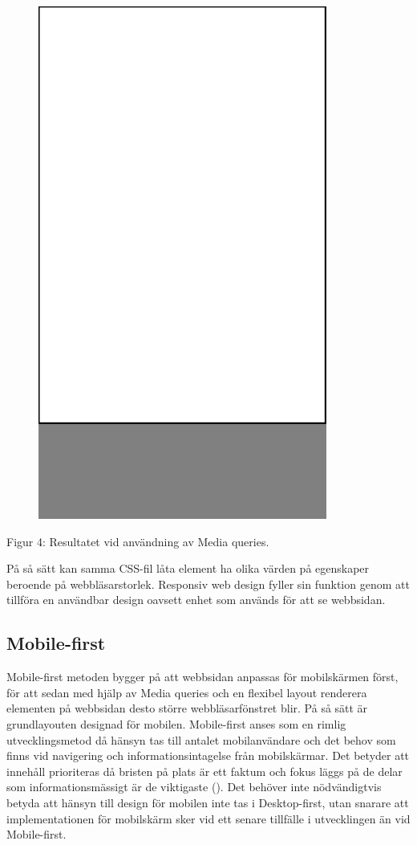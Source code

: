 \documentclass[11pt]{article}
\begin{document}
\vspace{1cm}
\begin{figure}[h]
\centerline{%
\includegraphics[scale=0.25]{pics/mobilesmall.png}
}
\end{figure}
\centerline{Figur 4: Resultatet vid användning av Media queries.}
\vspace{0.5cm}

På så sätt kan samma CSS-fil låta element ha olika värden på egenskaper beroende på webbläsarstorlek. Responsiv web design fyller sin funktion genom att tillföra en användbar design oavsett enhet som används för att se webbsidan. 
\newpage

\subsection{Mobile-first}
Mobile-first metoden bygger på att webbsidan anpassas för mobilskärmen först, för att sedan med hjälp av Media queries och en flexibel layout renderera elementen på webbsidan desto större webbläsarfönstret blir.  På så sätt är grundlayouten designad för mobilen. Mobile-first anses som en rimlig utvecklingsmetod då hänsyn tas till antalet mobilanvändare och det behov som finns vid navigering och informationsintagelse från mobilskärmar.  Det betyder att innehåll prioriteras då bristen på plats är ett faktum och fokus läggs på de delar som informationsmässigt är de viktigaste (\cite{Mobilefirst}). Det behöver inte nödvändigtvis betyda att hänsyn till design för mobilen inte tas i Desktop-first, utan snarare att implementationen för mobilskärm sker vid ett senare tillfälle i utvecklingen än vid Mobile-first.
\end{document}
